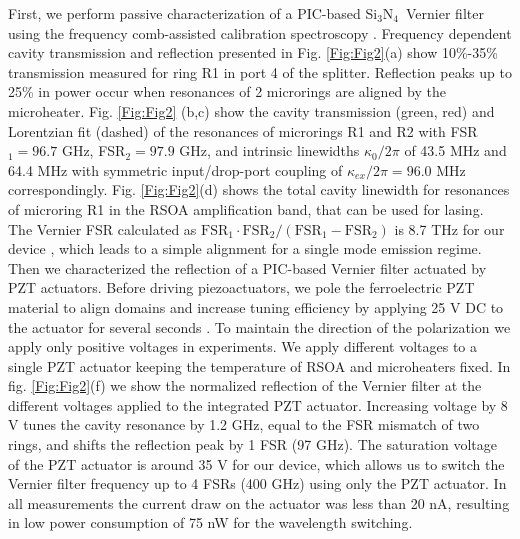 \documentclass[9pt,twocolumn,twoside, superscriptaddress]{revtex4-2}
\newcommand{\SiN}[0]{Si$_3$N$_4$~}
\begin{document}
First, we perform passive characterization of a PIC-based \SiN Vernier filter using the frequency comb-assisted calibration spectroscopy \cite{del2009frequency}.
Frequency dependent cavity transmission and reflection presented in Fig. \ref{Fig:Fig2}(a) show 10\%-35\% transmission measured for ring R1 in port 4 of the splitter.
Reflection peaks up to 25\% in power occur when resonances of 2 microrings are aligned by the microheater.
Fig. \ref{Fig:Fig2} (b,c) show the cavity transmission (green, red) and Lorentzian fit (dashed) of the resonances of microrings R1 and R2 with FSR$_1=96.7$ GHz, FSR$_2=97.9$ GHz, and intrinsic linewidths $\kappa_0/2\pi$ of 43.5 MHz and 64.4 MHz with symmetric input/drop-port coupling of $\kappa_{ex}/2\pi = 96.0$ MHz correspondingly.
Fig. \ref{Fig:Fig2}(d) shows the total cavity linewidth for resonances of microring R1 in the RSOA amplification band, that can be used for lasing.
The Vernier FSR \cite{tran2019tutorial} calculated as $\text{FSR}_1 \cdot \text{FSR}_2/(\text{FSR}_1-\text{FSR}_2)$ is 8.7 THz for our device \cite{tran2019tutorial}, which leads to a simple alignment for a single mode emission regime. Then we characterized the reflection of a PIC-based Vernier filter actuated by PZT actuators. Before driving piezoactuators, we pole the ferroelectric PZT material to align domains and increase tuning efficiency by applying 25 V DC to the actuator for several seconds \cite{4805529}.
To maintain the direction of the polarization we apply only positive voltages in experiments.
We apply different voltages to a single PZT actuator keeping the temperature of RSOA and microheaters fixed. 
In fig. \ref{Fig:Fig2}(f) we show the normalized reflection of the Vernier filter at the different voltages applied to the integrated PZT actuator. 
Increasing voltage by 8 V tunes the cavity resonance by 1.2 GHz, equal to the FSR mismatch of two rings, and shifts the reflection peak by 1 FSR (97 GHz).
The saturation voltage of the PZT actuator is around 35 V for our device, which allows us to switch the Vernier filter frequency up to 4 FSRs (400 GHz) using only the PZT actuator.
In all measurements the current draw on the actuator was less than 20 nA, resulting in low power consumption of 75 nW for the wavelength switching.
\end{document}
